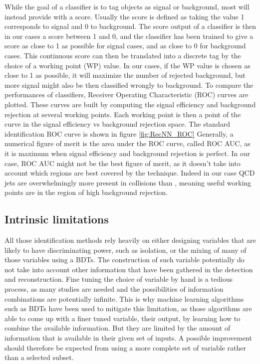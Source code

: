 While the goal of a classifier is to tag objects as signal or background, most will instead provide with a score. Usually the score is defined as taking the value 1 corresponds to signal and 0 to background. The score output of a classifier is then in our cases a score between 1 and 0, and the classifier has been trained to give a score as close to 1 as possible for signal cases, and as close to 0 for background cases. This continuous score can then be translated into a discrete tag by the choice of a working point (WP) value. In our cases, if the WP value is chosen as close to 1 as possible, it will maximize the number of rejected background, but more signal might also be then classified wrongly to background. To compare the performances of classifiers, Receiver Operating Characteristic (ROC) curves are plotted. These curves are built by computing the signal efficiency and background rejection at several working points. Each working point is then a point of the curve in the signal efficiency vs background rejection space. The standard identification ROC curve is shown in figure \ref{fig:RecNN_ROC}
Generally, a numerical figure of merit is the area under the ROC curve, called ROC AUC, as it is maximum when signal efficiency and background rejection is perfect.
In our case, ROC AUC might not be the best figure of merit, as it doesn't take into account which regions are best covered by the technique.
Indeed in our case QCD jets are overwhelmingly more present in collisions than \tauh, meaning useful working points are in the region of high background rejection. 

\subsection{Intrinsic limitations}

All those identification methods rely heavily on either designing variables that are likely to have discriminating power, such as isolation, or the mixing of many of those variables using a BDTs. The construction of such variable potentially do not take into account other information that have been gathered in the detection and reconstruction.
Fine tuning the choice of variable by hand is a tedious process, as many studies are needed and the possibilities of information combinations are potentially infinite. This is why machine learning algorithms such as BDTs have been used to mitigate this limitation, as those algorithms are able to come up with a finer tuned variable, their output, by learning how to combine the available information.
But they are limited by the amount of information that is available in their given set of inputs. 
A possible improvement should therefore be expected from using a more complete set of variable rather than a selected subset.



